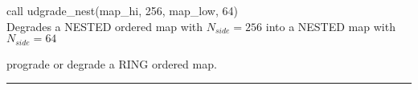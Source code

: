 \begin{example}
{
call udgrade\_nest(map\_hi, 256, map\_low, 64)  \\
}
{
Degrades a NESTED ordered map with $N_{side}=256$ into a NESTED map with $N_{side}=64$
}
\end{example}

\begin{related}
  \begin{sulist}{} %
  \item[\htmlref{udgrade\_ring}{sub:udgrade_ring}] prograde or degrade a RING
  ordered map.
  \end{sulist}
\end{related}

\rule{\hsize}{2mm}

\newpage
